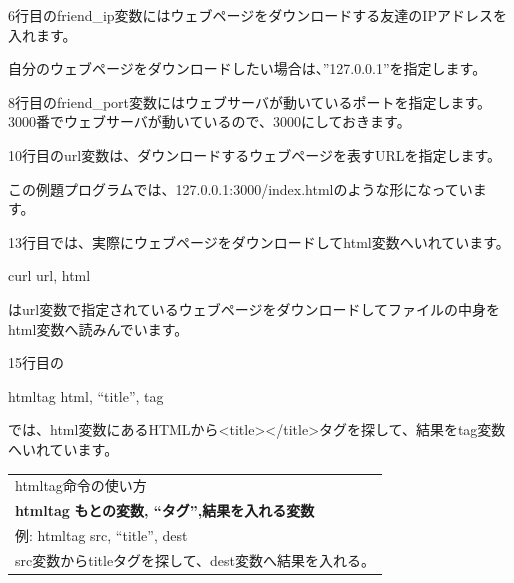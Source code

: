 \bigskip



\bigskip

6行目のfriend\_ip変数にはウェブページをダウンロードする友達のIPアドレスを入れます。

自分のウェブページをダウンロードしたい場合は、”127.0.0.1”を指定します。


\bigskip

8行目のfriend\_port変数にはウェブサーバが動いているポートを指定します。
3000番でウェブサーバが動いているので、3000にしておきます。


\bigskip

10行目のurl変数は、ダウンロードするウェブページを表すURLを指定します。

この例題プログラムでは、127.0.0.1:3000/index.htmlのような形になっています。


\bigskip

13行目では、実際にウェブページをダウンロードしてhtml変数へいれています。

curl url, html

はurl変数で指定されているウェブページをダウンロードしてファイルの中身をhtml変数へ読みんでいます。


\bigskip

\clearpage
15行目の

htmltag html, “title”, tag

では、html変数にあるHTMLから{\textless}title{\textgreater}{\textless}/title{\textgreater}タグを探して、結果をtag変数へいれています。


\bigskip








\begin{table}[htbp]
    \centering
    \begin{tabular}{|l|}
        \hline
        
        htmltag命令の使い方\\

        \textbf{htmltag} \textbf{もとの変数, “タグ”,結果を入れる変数}\\
        例: htmltag src, “title”, dest\\
        src変数からtitleタグを探して、dest変数へ結果を入れる。
        
        \\\hline
    \end{tabular}
\end{table}



